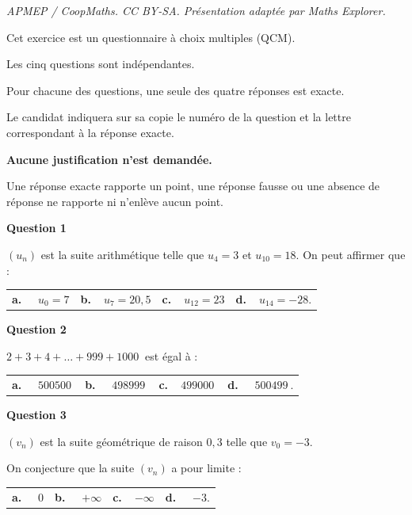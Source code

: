 \documentclass[10pt]{article}
\providecommand{\np}[2][]{{#2~#1}}
\begin{document}
\noindent\textit{APMEP / CoopMaths. CC BY-SA. Présentation adaptée par Maths Explorer.}\par\medskip
\medskip

Cet exercice est un questionnaire à choix multiples (QCM). 

Les cinq questions sont indépendantes.

Pour chacune des questions, une seule des quatre réponses est exacte.

Le candidat indiquera sur sa copie le numéro de la question et la lettre correspondant à la
réponse exacte.

\textbf{Aucune justification n’est demandée.}

Une réponse exacte rapporte un point, une réponse fausse ou une absence de réponse ne rapporte ni n’enlève aucun point.

\medskip

\textbf{Question 1}

\medskip 


$\left(u_n\right)$ est la suite arithmétique telle que $u_4 = 3$ et $u_{10} = 18$. On peut affirmer que :

\medskip

\begin{tabularx}{\linewidth}{*{4}{X}}
\textbf{a.~~} $ u_0 = 7$ &\textbf{b.~~}$u_7 = 20,5$&\textbf{c.~~}$u_{12} = 23$& \textbf{d.~~}$u_{14} = -28$.
\end{tabularx}

\medskip

\textbf{Question 2}

\medskip 

$2 + 3 + 4 + \dots + 999 + \np{1000}$ est égal à :

\medskip

\begin{tabularx}{\linewidth}{*{4}{X}}
\textbf{a.~~} $\np{500500}$ &\textbf{b.~~} $\np{498999}$&\textbf{c.~~}$\np{499000}$& \textbf{d.~~} $\np{500499}$.
\end{tabularx}

\medskip

\textbf{Question 3}

\medskip


$\left(v_n\right)$ est la suite géométrique de raison $0,3$ telle que $v_0 = -3$.

On conjecture que la suite $\left(v_n\right)$ a pour limite : 

\medskip

\begin{tabularx}{\linewidth}{*{4}{X}}
\textbf{a.~~} $0$ &\textbf{b.~~} $+\infty$&\textbf{c.~~}$-\infty$& \textbf{d.~~} $-3$.
\end{tabularx}
\end{document}
